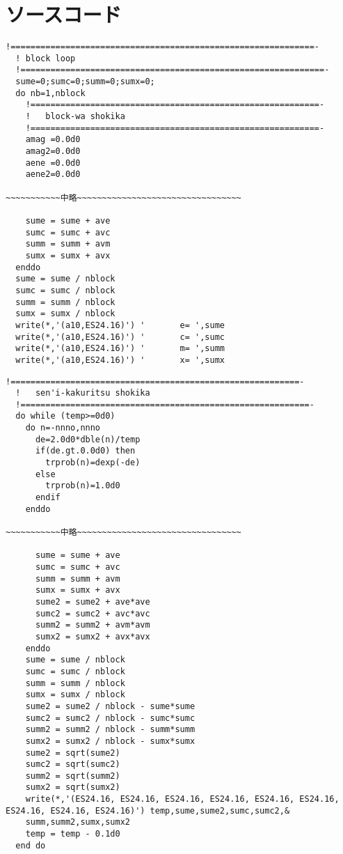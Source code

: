 \appendix
\def\thesection{補遺\Alph{section}}
\renewcommand*{\thelstlisting}{\Alph{section}.\arabic{lstlisting}}
\section{ソースコード}
\begin{lstlisting}[caption=5-Aのソースコード,label=src5a]
  !=============================================================-
  ! block loop
  !=============================================================-
  sume=0;sumc=0;summ=0;sumx=0;
  do nb=1,nblock
    !==========================================================-
    !   block-wa shokika
    !==========================================================-
    amag =0.0d0
    amag2=0.0d0
    aene =0.0d0
    aene2=0.0d0

~~~~~~~~~~~中略~~~~~~~~~~~~~~~~~~~~~~~~~~~~~~~~~

    sume = sume + ave
    sumc = sumc + avc
    summ = summ + avm
    sumx = sumx + avx
  enddo
  sume = sume / nblock
  sumc = sumc / nblock
  summ = summ / nblock
  sumx = sumx / nblock
  write(*,'(a10,ES24.16)') '       e= ',sume
  write(*,'(a10,ES24.16)') '       c= ',sumc
  write(*,'(a10,ES24.16)') '       m= ',summ
  write(*,'(a10,ES24.16)') '       x= ',sumx
\end{lstlisting}
\newpage
\begin{lstlisting}[caption=5-Aのソースコード,label=src5b]
  !==========================================================-
  !   sen'i-kakuritsu shokika
  !==========================================================-
  do while (temp>=0d0)
    do n=-nnno,nnno
      de=2.0d0*dble(n)/temp
      if(de.gt.0.0d0) then
        trprob(n)=dexp(-de)
      else
        trprob(n)=1.0d0
      endif
    enddo
    
~~~~~~~~~~~中略~~~~~~~~~~~~~~~~~~~~~~~~~~~~~~~~~

      sume = sume + ave
      sumc = sumc + avc
      summ = summ + avm
      sumx = sumx + avx
      sume2 = sume2 + ave*ave
      sumc2 = sumc2 + avc*avc
      summ2 = summ2 + avm*avm
      sumx2 = sumx2 + avx*avx
    enddo
    sume = sume / nblock
    sumc = sumc / nblock
    summ = summ / nblock
    sumx = sumx / nblock
    sume2 = sume2 / nblock - sume*sume
    sumc2 = sumc2 / nblock - sumc*sumc
    summ2 = summ2 / nblock - summ*summ
    sumx2 = sumx2 / nblock - sumx*sumx
    sume2 = sqrt(sume2)
    sumc2 = sqrt(sumc2)
    summ2 = sqrt(summ2)
    sumx2 = sqrt(sumx2)
    write(*,'(ES24.16, ES24.16, ES24.16, ES24.16, ES24.16, ES24.16, ES24.16, ES24.16, ES24.16)') temp,sume,sume2,sumc,sumc2,&
    summ,summ2,sumx,sumx2
    temp = temp - 0.1d0
  end do
\end{lstlisting}
